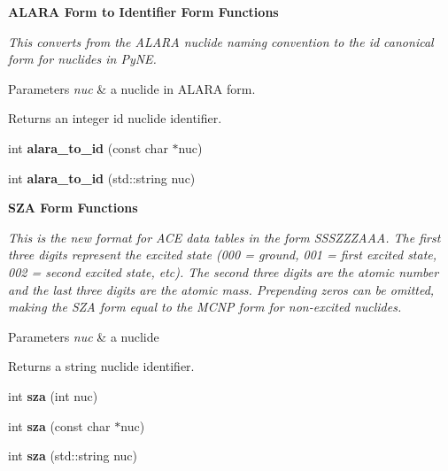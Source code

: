 \begin{Indent}\textbf{ A\+L\+A\+RA Form to Identifier Form Functions}\par
{\em This converts from the A\+L\+A\+RA nuclide naming convention to the id canonical form for nuclides in Py\+NE. 
\begin{DoxyParams}{Parameters}
{\em nuc} & a nuclide in A\+L\+A\+RA form. \\
\hline
\end{DoxyParams}
\begin{DoxyReturn}{Returns}
an integer id nuclide identifier. 
\end{DoxyReturn}
}\begin{DoxyCompactItemize}
\item 
\mbox{\label{namespacepyne_1_1nucname_a18f1a650ff6326ae473a53ecbf3db1ac}} 
int {\bfseries alara\+\_\+to\+\_\+id} (const char $\ast$nuc)
\item 
\mbox{\label{namespacepyne_1_1nucname_aa9cbfbadae0f367edadd700a036d0c8a}} 
int {\bfseries alara\+\_\+to\+\_\+id} (std\+::string nuc)
\end{DoxyCompactItemize}
\end{Indent}
\begin{Indent}\textbf{ S\+ZA Form Functions}\par
{\em This is the new format for A\+CE data tables in the form S\+S\+S\+Z\+Z\+Z\+A\+AA. The first three digits represent the excited state (000 = ground, 001 = first excited state, 002 = second excited state, etc). The second three digits are the atomic number and the last three digits are the atomic mass. Prepending zeros can be omitted, making the S\+ZA form equal to the M\+C\+NP form for non-\/excited nuclides. 
\begin{DoxyParams}{Parameters}
{\em nuc} & a nuclide \\
\hline
\end{DoxyParams}
\begin{DoxyReturn}{Returns}
a string nuclide identifier. 
\end{DoxyReturn}
}\begin{DoxyCompactItemize}
\item 
\mbox{\label{namespacepyne_1_1nucname_a4e8f78a4dca435b5b7098a34fe20a76b}} 
int {\bfseries sza} (int nuc)
\item 
\mbox{\label{namespacepyne_1_1nucname_adbcf02b0748a34d84e3641997caa38ef}} 
int {\bfseries sza} (const char $\ast$nuc)
\item 
\mbox{\label{namespacepyne_1_1nucname_a94c67c8e183760971dfa262057a0deb4}} 
int {\bfseries sza} (std\+::string nuc)
\end{DoxyCompactItemize}
\end{Indent}
